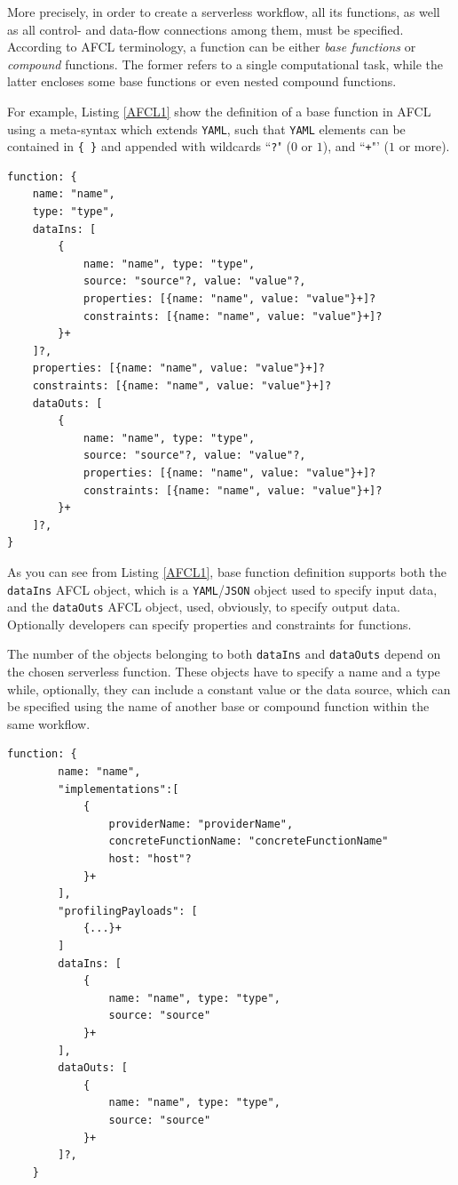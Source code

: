 \documentclass[12pt,a4paper]{report}
\newcommand{\QuoteIntro}{``}
\begin{document}
More precisely, in order to create a serverless workflow, all its functions, as well as all control- and data-flow connections among them, must be specified. According to AFCL terminology, a function can be either \textit{base functions} or \textit{compound} functions. The former refers to a single computational task, while the latter encloses some base functions or even nested compound functions.

For example, Listing \ref{AFCL1} show the definition of a base function in AFCL using a meta-syntax which extends \texttt{YAML}, such that \texttt{YAML} elements can be contained in \texttt{\{ \}} and appended with wildcards \QuoteIntro\texttt{?}" ($0$ or $1$), and \QuoteIntro\texttt{+}"’ ($1$ or more).

\begin{lstlisting}[frame=lines, caption={Definition of a base function in AFCL}, label={AFCL1}]
function: {
	name: "name",
	type: "type",
	dataIns: [
		{
			name: "name", type: "type",
			source: "source"?, value: "value"?,
			properties: [{name: "name", value: "value"}+]?
			constraints: [{name: "name", value: "value"}+]?
		}+
	]?,
	properties: [{name: "name", value: "value"}+]?
	constraints: [{name: "name", value: "value"}+]?
	dataOuts: [
		{
			name: "name", type: "type",
			source: "source"?, value: "value"?,
			properties: [{name: "name", value: "value"}+]?
			constraints: [{name: "name", value: "value"}+]?
		}+
	]?,
}
\end{lstlisting}

As you can see from Listing \ref{AFCL1}, base function definition supports both the \texttt{dataIns} AFCL object, which is a \texttt{YAML}/\texttt{JSON} object used to specify input data, and the \texttt{dataOuts} AFCL object, used, obviously, to specify output data\cite{AFCL}. Optionally developers can specify properties and constraints for functions. 

The number of the objects belonging to both \texttt{dataIns} and \texttt{dataOuts} depend on the chosen serverless function. These objects have to specify a name and a type while, optionally, they can include a constant value or the data source, which can be specified using the name of another base or compound function within the same workflow. 

\begin{lstlisting}[frame=lines, caption={Definition of a serverless function according to our custom AFCL.}, label={AFCL2}]
	function: {
		name: "name",
		"implementations":[
			{
				providerName: "providerName", 
				concreteFunctionName: "concreteFunctionName"
				host: "host"?
			}+
		],
		"profilingPayloads": [
			{...}+
		]
		dataIns: [
			{
				name: "name", type: "type",
				source: "source"
			}+
		],
		dataOuts: [
			{
				name: "name", type: "type",
				source: "source"
			}+
		]?,
	}
\end{lstlisting}
\end{document}
